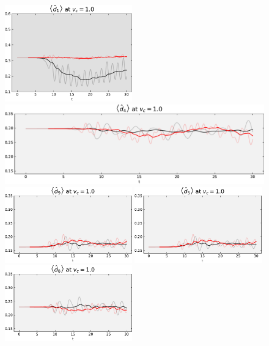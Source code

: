 \begin{figure}[!hbt]
\begin{minipage}[b]{.49\textwidth}
                \includegraphics[width=0.49\textwidth]{graph/double_occupation/double_occupation_vc_10_site_1.pdf}
                \includegraphics[width=1.00\textwidth]{graph/double_occupation/double_occupation_vc_10_site_4.pdf}
                \includegraphics[width=0.49\textwidth]{graph/double_occupation/double_occupation_vc_10_site_9.pdf}
                \includegraphics[width=0.49\textwidth]{graph/double_occupation/double_occupation_vc_10_site_5.pdf}
                \includegraphics[width=0.49\textwidth]{graph/double_occupation/double_occupation_vc_10_site_8.pdf}

\end{minipage}
\end{figure}
